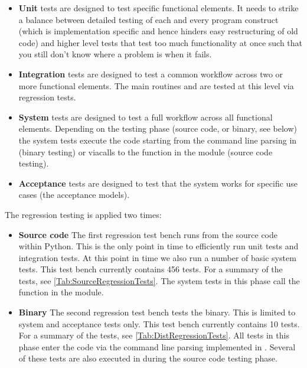 \begin{itemize}
\item \textbf{Unit} tests are designed to test specific functional elements.
It needs to strike a balance between detailed testing of each and every program construct (which is implementation specific and hence hinders easy restructuring of old code) and higher level tests that test too much functionality at once such that you still don't know where a problem is when it fails.

\item \textbf{Integration} tests are designed to test a common workflow across two or more functional elements.
The main routines  and  are tested at this level via regression tests.

\item \textbf{System} tests are designed to test a full workflow across all functional elements.
Depending on the testing phase (source code, or binary, see below) the system tests execute the code starting from the command line parsing in  (binary testing) or viacalls to the  function in the  module (source code testing).

\item \textbf{Acceptance} tests are designed to test that the system works for specific use cases (the acceptance models).
\end{itemize}

The regression testing is applied two times:

\begin{itemize}
\item \textbf{Source code} The first regression test bench runs from the source code within Python.
This is the only point in time to efficiently run unit tests and integration tests.
At this point in time we also run a number of basic system tests.
This test bench currently contains 456 tests.
For a summary of the tests, see \autoref{Tab:SourceRegressionTests}.
The system tests in this phase call the  function in the  module.

\item \textbf{Binary} The second regression test bench tests the binary.
This is limited to system and acceptance tests only.
This test bench currently contains 10 tests.
For a summary of the tests, see \autoref{Tab:DistRegressionTests}.
All tests in this phase enter the code via the command line parsing implemented in .
Several of these tests are also executed in during the source code testing phase.
\end{itemize}

